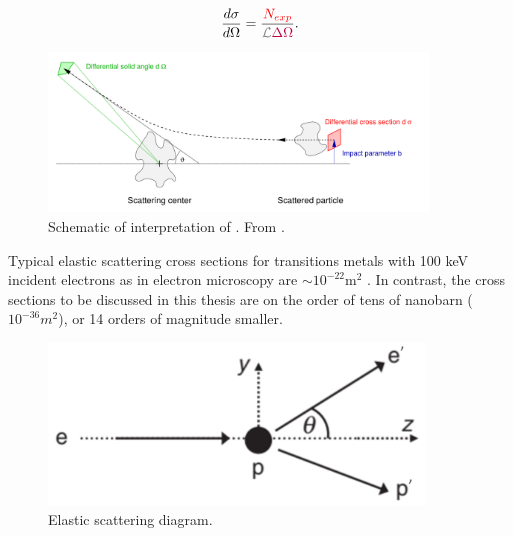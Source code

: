         \begin{equation} \labelAndRemember{eq:basic_diff_xsec}
            {\frac{d\sigma}{d\Omega} = \frac{ \counts} {\Lumi \textcolor{purple}{\Delta \Omega}}.}
        \end{equation}

        \begin{figure}[H]
            \centering
            \includegraphics[width=0.9\textwidth]{Chapters/Ch1-Intro/Ch1-Sec1-Background/pics/wikipedia_cross_section.png}
            \caption[Generalized cross section schematic]{Schematic of interpretation of \xsec. From \parencite{Vswitchs2014DifferentialSchematic}.}
            \label{fig:cross_section_idea}
        \end{figure}

        
        Typical elastic scattering cross sections for transitions metals with 100 keV incident electrons as in electron microscopy are $\sim 10^{-22} \text{m} ^2$ \parencite{Williams2009TransmissionMicroscopy}. In contrast, the cross sections to be discussed in this thesis are on the order of tens of nanobarn ( $10^{-36} m^2$), or 14 orders of magnitude smaller.         
        

        \begin{figure}[H]
            \centering
            \includegraphics[width=10cm]{Chapters/Ch1-Intro/Ch1-Sec1-Background/pics/elastic-ep/kine-e-2.PNG}
            \caption{Elastic scattering diagram.}
        \end{figure}


